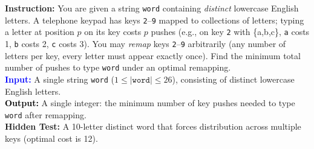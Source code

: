 \documentclass{article} %
\theoremstyle{definition}
\theoremstyle{remark}
\begin{document}
\begin{tcolorbox}[colback=bg,
title=\textbf{Question and Hidden Test in LeetCode}]
\begin{flushleft}
\textcolor{softblue}{\textbf{Instruction:}} You are given a string \texttt{word} containing \emph{distinct} lowercase English letters. A telephone keypad has keys \texttt{2}--\texttt{9} mapped to collections of letters; typing a letter at position $p$ on its key costs $p$ pushes (e.g., on key \texttt{2} with \{a,b,c\}, \texttt{a} costs 1, \texttt{b} costs 2, \texttt{c} costs 3). You may \emph{remap} keys \texttt{2}--\texttt{9} arbitrarily (any number of letters per key, every letter must appear exactly once). Find the minimum total number of pushes to type \texttt{word} under an optimal remapping.\\[4pt]

\textcolor{blue}{\textbf{Input:}} A single string \texttt{word} ($1 \le |{\texttt{word}}| \le 26$), consisting of distinct lowercase English letters.\\[2pt]

\textcolor{Black}{\textbf{Output:}} A single integer: the minimum number of key pushes needed to type \texttt{word} after remapping.\\[6pt]

{\textbf{Hidden Test:}} A 10-letter distinct word that forces distribution across multiple keys (optimal cost is 12).\\
\end{flushleft}
\end{tcolorbox}
\end{document}
